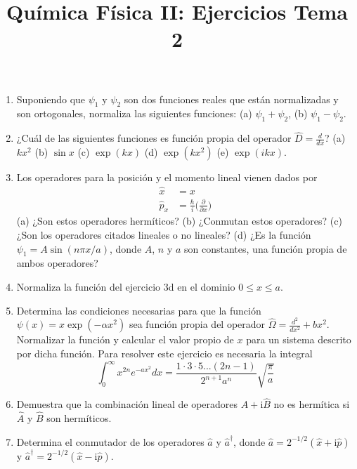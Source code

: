 \documentclass{tufte-handout}
\title[Química Física II: Ejercicios Tema 2]{
Química Física II: Ejercicios Tema 2}
\date{}  %
\begin{document}
\maketitle
\large
\begin{enumerate}
    \item Suponiendo que $\psi_1$ y
    $\psi_2$ son dos funciones reales que 
    están normalizadas y son ortogonales, 
    normaliza las siguientes funciones:
    (a) $\psi_1+\psi_2$, (b) 
    $\psi_1-\psi_2$.
    
    \item ¿Cuál de las siguientes funciones
    es función propia del operador
    $\hat{D}=\frac{d}{dx}$? (a) $kx^2$
    (b) $\sin x$ (c) $\exp (kx)$ 
    (d) $\exp(kx^2)$ (e) $\exp(ikx)$.
    
    \item Los operadores para la posición y
    el momento lineal vienen dados por 
    \begin{equation}
        \begin{array}{cc}
             \hat{x}& =x  \\
            \hat{p}_x& =\frac{\hbar}{i}\big(\frac{\partial}{\partial x}\big)
        \end{array}
    \end{equation}
    (a) ¿Son estos operadores hermíticos?
    (b) ¿Conmutan estos operadores?
    (c) ¿Son los operadores citados lineales
    o no lineales?
    (d) ¿Es la función $\psi_1=A\sin (n\pi
    x/a)$, donde $A$, $n$ y $a$ son
    constantes, una función propia de ambos
    operadores?
   
   \item Normaliza la función del ejercicio
   3d en el dominio $0\leq x\leq a$.
   
   \item Determina las condiciones necesarias 
   para que la función $\psi(x)=x\exp(-\alpha
   x^2)$ sea función propia del operador 
   $\hat{\Omega}=\frac{d^2}{dx^2} + bx^2$.
   Normalizar la función y calcular el valor 
   propio de $x$ para un
   sistema descrito por dicha función. Para resolver
   este ejercicio es necesaria la integral
   \begin{equation}
       \int_0^{\infty}x^{2n}e^{-ax^2}dx = 
       \frac{1\cdot 3\cdot 5... (2n-1)}{2^{n+1}a^n}\sqrt{\frac{\pi}{a}}
   \end{equation}

   \item Demuestra que la combinación lineal de
   operadores $\hat{A}+\mathrm{i}\hat{B}$ no es hermítica
   si $\hat{A}$ y $\hat{B}$ son hermíticos.

   \item Determina el conmutador de los operadores
   $\hat{a}$ y $\hat{a}^\dagger$, donde $\hat{a}=2^{-1/2}(\hat{x}+\mathrm{i}\hat{p})$
   y $\hat{a}^\dagger=2^{-1/2}(\hat{x}-\mathrm{i}\hat{p})$.
\end{enumerate}
\end{document}
